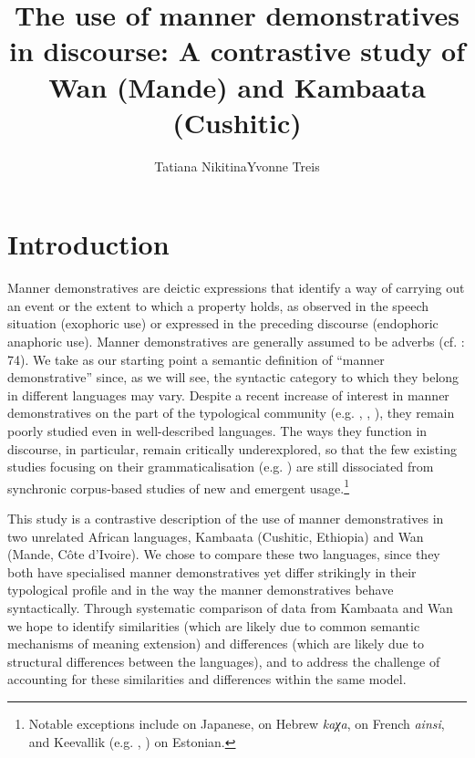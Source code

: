 \documentclass[output=paper,colorlinks,citecolor=brown]{langscibook}
\author{Tatiana Nikitina\affiliation{LLACAN (CNRS, INALCO)}\orcid{}\lastand Yvonne Treis\affiliation{LLACAN (CNRS, INALCO)}\orcid{}}
\title{The use of manner demonstratives in discourse: A contrastive study of Wan (Mande) and Kambaata (Cushitic)}
\begin{document}
\maketitle
{}

\section{Introduction}\label{sec:nikitina:1}


Manner demonstratives are deictic expressions that identify a way of carrying out an event or the extent to which a property holds, as observed in the speech situation (exophoric use) or expressed in the preceding discourse (endophoric anaphoric use). Manner demonstratives are generally assumed to be adverbs (cf. \citealt{Diessel1999Book}: 74). We take as our starting point a semantic definition of “manner demonstrative” since, as we will see, the syntactic category to which they belong in different languages may vary. Despite a recent increase of interest in manner demonstratives on the part of the typological community (e.g. \citealt{Guérin2015}, \citealt{König2017}, \citealt{KönigUmbach2018}), they remain poorly studied even in well-described languages. The ways they function in discourse, in particular, remain critically underexplored, so that the few existing studies focusing on their grammaticalisation (e.g. \citealt{König2015}) are still dissociated from synchronic corpus-based studies of new and emergent usage.\footnote{Notable exceptions include \citet{KönigNishina2015} on Japanese, \citet{Shor2018} on Hebrew \textit{kaχa}, \citet{KarssenbergLahousse2018} on French \textit{ainsi}, and Keevallik (e.g. \citeyear{Keevallik2005}, \citeyear{Keevallik2010}) on Estonian.}

This study is a contrastive description of the use of manner demonstratives in two unrelated African languages, Kambaata (Cushitic, Ethiopia) and Wan (Mande, Côte d’Ivoire). We chose to compare these two languages, since they both have specialised manner demonstratives yet differ strikingly in their typological profile and in the way the manner demonstratives behave syntactically. Through systematic comparison of data from Kambaata and Wan we hope to identify similarities (which are likely due to common semantic mechanisms of meaning extension) and differences (which are likely due to structural differences between the languages), and to address the challenge of accounting for these similarities and differences within the same model.
\end{document}
